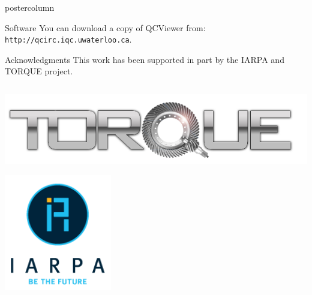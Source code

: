 \documentclass[final]{beamer} %
\begin{document}
\begin{frame}{}
\begin{columns}
\begin{column}{.33\textwidth}
\begin{beamercolorbox}[center,wd=\textwidth]{postercolumn}
\begin{minipage}[c][0.95\textheight][s]{0.95\columnwidth}
\begin{block}{\large Software}
                You can download a copy of QCViewer from: \texttt{http://qcirc.iqc.uwaterloo.ca}.
            \end{block}
            \vfill
            \begin{block}{\large Acknowledgments}
                This work has been supported in part by the IARPA and TORQUE project.
                \begin{center}
                    \includegraphics[height=1.5in]{figures/torque.png} \\ \includegraphics[height=2in]{figures/iarpa_logo.png}
                \end{center}
            \end{block}
        \end{minipage}
        \end{beamercolorbox}
        \end{column}
    \end{columns}
    \end{frame}
\end{document}

